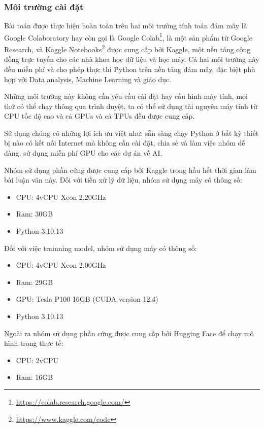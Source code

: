 \subsubsection{Môi trường cài đặt}
Bài toán được thực hiện hoàn toàn trên hai môi trường tính toán đám mây là Google Colaboratory hay còn gọi là Google Colab\footnote{\url{https://colab.research.google.com/}}, là một sản phẩm từ Google Research, và Kaggle Notebooks\footnote{\url{https://www.kaggle.com/code}} được cung cấp bởi Kaggle, một nền tảng cộng đồng trực tuyến cho các nhà khoa học dữ liệu và học máy. Cả hai môi trường này đều miễn phí và cho phép thực thi Python trên nền tảng đám mây, đặc biệt phù hợp với Data analysis, Machine Learning và giáo dục.

Những môi trường này không cần yêu cầu cài đặt hay cấu hình máy tính, mọi thứ có thể chạy thông qua trình duyệt, ta có thể sử dụng tài nguyên máy tính từ CPU tốc độ cao và cả GPUs và cả TPUs đều được cung cấp.

Sử dụng chúng có những lợi ích ưu việt như: sẵn sàng chạy Python ở bất kỳ thiết bị nào có kết nối Internet mà không cần cài đặt, chia sẻ và làm việc nhóm dễ dàng, sử dụng miễn phí GPU cho các dự án về AI\cite{webpage15}.

Nhóm sử dụng phần cứng được cung cấp bởi Kaggle trong hầu hết thời gian làm bài luận văn này. Đối với tiền xử lý dữ liệu, nhóm sử dụng máy có thông số:
\begin{itemize}
    \item CPU: 4vCPU Xeon 2.20GHz
    \item Ram: 30GB
    \item Python 3.10.13
\end{itemize}
Đối với việc trainning model, nhóm sử dụng máy có thông số:
\begin{itemize}
    \item CPU: 4vCPU Xeon 2.00GHz
    \item Ram: 29GB
    \item GPU: Tesla P100 16GB (CUDA version 12.4)
    \item Python 3.10.13
\end{itemize}
Ngoài ra nhóm sử dụng phần cứng được cung cấp bởi Hugging Face để chạy mô hình trong thực tế:
\begin{itemize}
    \item CPU: 2vCPU
    \item Ram: 16GB
\end{itemize}

